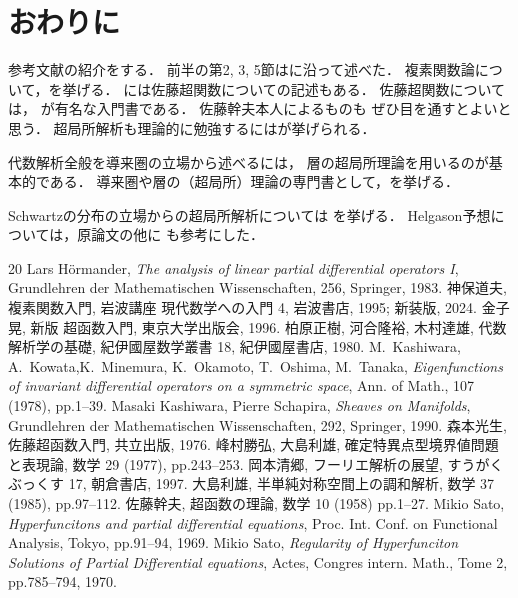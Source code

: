 \section*{おわりに}
参考文献の紹介をする．
前半の第2, 3, 5節は\cite{Ok97}に沿って述べた．
複素関数論について，\cite{J95}を挙げる．
\cite{J95}には佐藤超関数についての記述もある．
佐藤超関数については，
\cite{Kan96,Mori76}が有名な入門書である．
佐藤幹夫本人によるもの\cite{Sato58}も
ぜひ目を通すとよいと思う．
超局所解析も理論的に勉強するには\cite{KKK80}が挙げられる．

代数解析全般を導来圏の立場から述べるには，
層の超局所理論を用いるのが基本的である．
導来圏や層の（超局所）理論の専門書として，\cite{KS90}を挙げる．

Schwartzの分布の立場からの超局所解析については
\cite{ALPDO}を挙げる．
Helgason予想については，原論文\cite{KKKOOT78}の他に
\cite{MO77,Os85}も参考にした．
\begin{thebibliography}{20} 
   Lars H\"ormander,
    \textit{The analysis of linear partial differential operators I}, 
    Grundlehren der Mathematischen Wissenschaften, 256, Springer, 1983.
   神保道夫, 
  {複素関数入門}, 岩波講座 現代数学への入門 4, 岩波書店, 1995; 新装版, 2024. 
   金子晃, 新版 超函数入門, 東京大学出版会, 1996. 
   柏原正樹, 河合隆裕, 木村達雄, 
  代数解析学の基礎, 紀伊國屋数学叢書 18, 紀伊國屋書店, 1980.
   M.~Kashiwara, 
  A.~Kowata,K.~Minemura, K.~Okamoto, T.~Oshima, M.~Tanaka, 
  \emph{Eigenfunctions of invariant differential operators on a symmetric space}, Ann. of Math., 107 (1978), pp.1--39.
   Masaki Kashiwara, Pierre Schapira, 
    \textit{Sheaves on Manifolds}, 
    Grundlehren der Mathematischen Wissenschaften, 292, Springer, 1990.
   森本光生, 佐藤超函数入門, 共立出版, 1976. 
   峰村勝弘, 大島利雄, 
  確定特異点型境界値問題と表現論, 数学 29 (1977), pp.243--253. 
   岡本清郷, 
  {フーリエ解析の展望}, すうがくぶっくす 17, 朝倉書店, 1997.
   大島利雄, 
  半単純対称空間上の調和解析, 数学 37 (1985), pp.97--112. 
   佐藤幹夫, 超函数の理論, 数学 10 (1958) pp.1--27. 
   Mikio Sato, 
  \textit{Hyperfuncitons and 
  partial differential equations}, 
  Proc. Int. Conf. on Functional Analysis, Tokyo, pp.91--94, 1969.
   Mikio Sato, 
  \textit{Regularity of Hyperfunciton Solutions of 
  Partial Differential equations}, 
  Actes, Congres intern. Math., 
  Tome 2, pp.785--794, 1970.
\end{thebibliography}



